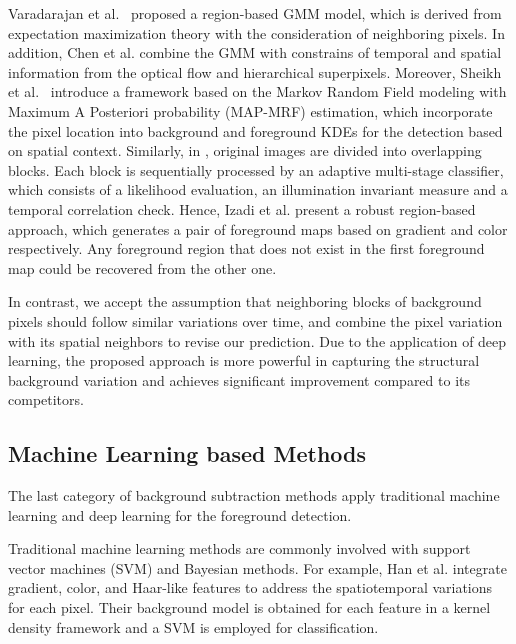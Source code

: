 \documentclass[journal]{IEEEtran}
\begin{document}
Varadarajan et al.\ \cite{2015_PR_Varadarajan20153488} proposed a region-based GMM model,
which is derived from expectation maximization theory with the consideration of neighboring pixels.
In addition, 
Chen et al. \cite{2017_TPAMI_GANGWANG} combine the GMM with constrains of temporal and spatial information from the optical flow and hierarchical superpixels.
Moreover, 
Sheikh et al.\ \cite{Sheikh2005Bayesian} introduce a framework based on the Markov Random Field modeling with Maximum A Posteriori 
probability (MAP-MRF) estimation, which incorporate the pixel location into background and foreground KDEs for the detection based on spatial context.
Similarly, in \cite{Reddy2010Robust}, original images are divided into overlapping blocks. Each block is sequentially processed by an adaptive multi-stage classifier, which consists of a likelihood evaluation, an illumination invariant measure and a temporal correlation check.
Hence, Izadi et al.\cite{Izadi2008Robust} present a robust region-based approach, which generates a pair of foreground maps based on gradient and color respectively. Any foreground region that does not exist in the first foreground map could be recovered from the other one.

In contrast, we accept the assumption that neighboring blocks of background pixels should follow similar variations over time, and combine the pixel variation with its spatial neighbors to revise our prediction. 
Due to the application of deep learning, the proposed approach is more powerful in capturing the structural background variation and achieves significant improvement compared to its competitors.
%
%
%
\subsection{Machine Learning based Methods}
The last category of background subtraction methods apply traditional machine learning and deep learning for the foreground detection.

%
Traditional machine learning methods are commonly involved with support vector machines (SVM)\cite{Han2012} and Bayesian methods\cite{Zhang2014Statis}. For example, Han et al. \cite{Han2012} integrate gradient, color, and Haar-like features to address the spatiotemporal variations for each pixel. Their background model is obtained for each feature in a kernel density framework and a SVM is employed for classification.
\end{document}

